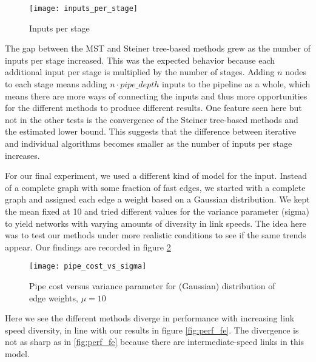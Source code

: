 \documentclass{acmart}
\begin{document}
	 \begin{figure}[H]
	     \centering
	     \texttt{[image: inputs\_per\_stage]}
	     \caption{Inputs per stage}
	     \label{fig:perf_ips}
	 \end{figure}
	 
	 The gap between the MST and Steiner tree-based methods grew as the number of inputs per stage increased. This was the expected behavior because each additional input per stage is multiplied by the number of stages. Adding $n$ nodes to each stage means adding $n \cdot pipe\_depth$ inputs to the pipeline as a whole, which means there are more ways of connecting the inputs and thus more opportunities for the different methods to produce different results. One feature seen here but not in the other tests is the convergence of the Steiner tree-based methods and the estimated lower bound. This suggests that the difference between iterative and individual algorithms becomes smaller as the number of inputs per stage increases.
	 
	 For our final experiment, we used a different kind of model for the input. Instead of a complete graph with some fraction of fast edges, we started with a complete graph and assigned each edge a weight based on a Gaussian distribution.  We kept the mean fixed at 10 and tried different values for the variance parameter (sigma) to yield networks with varying amounts of diversity in link speeds. The idea here was to test our methods under more realistic conditions to see if the same trends appear. Our findings are recorded in figure \ref{fig:perf_rand}
	 
	 \begin{figure}[H]
	     \centering
	     \texttt{[image: pipe\_cost\_vs\_sigma]}
	     \caption{Pipe cost versus variance parameter for (Gaussian) distribution of edge weights, $\mu = 10$}
	     \label{fig:perf_rand}
	 \end{figure}
	 
	Here we see the different methods diverge in performance with increasing link speed diversity, in line with our results in figure \ref{fig:perf_fe}. The divergence is not as sharp as in \ref{fig:perf_fe} because there are intermediate-speed links in this model. 
 	
\end{document}
